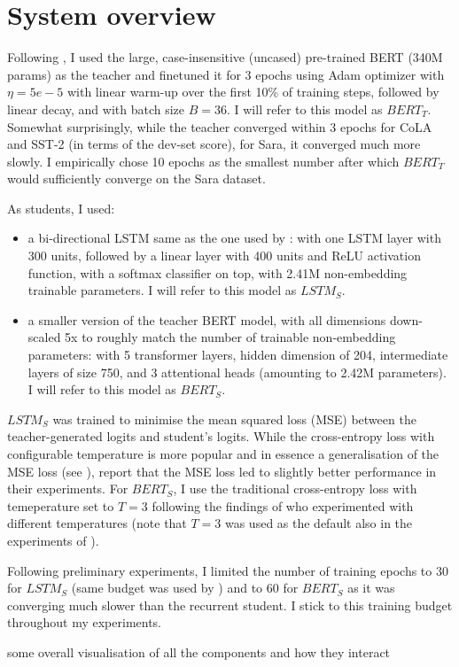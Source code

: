 \documentclass[bsc,frontabs,twoside,singlespacing,parskip,deptreport]{infthesis}
\begin{document}
{  \section{System overview}{    
    Following \citet{Tang_2019b}, I used the large, case-insensitive (uncased) pre-trained BERT (340M params) as the teacher and finetuned it for 3 epochs using Adam optimizer with $\eta=5e-5$ with linear warm-up over the first 10\% of training steps, followed by linear decay, and with batch size $B=36$. I will refer to this model as $BERT_T$. Somewhat surprisingly, while the teacher converged within 3 epochs for CoLA and SST-2 (in terms of the dev-set score), for Sara, it converged much more slowly. I empirically chose 10 epochs as the smallest number after which $BERT_T$ would sufficiently converge on the Sara dataset.

    As students, I used:
    \begin{itemize}
      \item a bi-directional LSTM same as the one used by \citet{Tang_2019b}: with one LSTM layer with 300 units, followed by a linear layer with 400 units and ReLU activation function, with a softmax classifier on top, with 2.41M non-embedding trainable parameters. I will refer to this model as $LSTM_S$.
      \item a smaller version of the teacher BERT model, with all dimensions down-scaled 5x to roughly match the number of trainable non-embedding parameters: with 5 transformer layers, hidden dimension of 204, intermediate layers of size 750, and 3 attentional heads (amounting to 2.42M parameters). I will refer to this model as $BERT_S$.
    \end{itemize}

    $LSTM_S$ was trained to minimise the mean squared loss (MSE) between the teacher-generated logits and student's logits. While the cross-entropy loss with configurable temperature is more popular and in essence a generalisation of the MSE loss (see \citet{Hinton_2015}), \citet{Tang_2019b} report that the MSE loss led to slightly better performance in their experiments. For $BERT_S$, I use the traditional cross-entropy loss with temeperature set to $T=3$ following the findings of \citet{Tsai_2019} who experimented with different temperatures (note that $T=3$ was used as the default also in the experiments of \citet{Tang_2019b}).

    Following preliminary experiments, I limited the number of training epochs to 30 for $LSTM_S$ (same budget was used by \citet{Tang_2019b}) and to 60 for $BERT_S$ as it was converging much slower than the recurrent student. I stick to this training budget throughout my experiments.

    some overall visualisation of all the components and how they interact
  }
}
\end{document}
